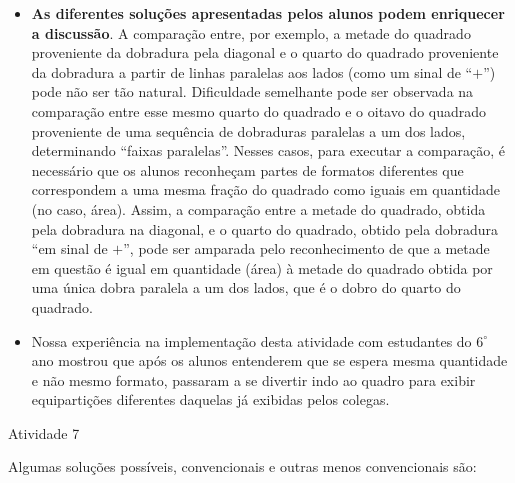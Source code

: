\begin{multicols}{2}
\begin{itemize}
    \item \textbf{As diferentes soluções apresentadas pelos alunos podem enriquecer a discussão}. A comparação entre, por exemplo, a metade do quadrado proveniente da dobradura pela diagonal e o quarto do quadrado proveniente da dobradura a partir de linhas paralelas aos lados (como um sinal de ``$+$'') pode não ser tão natural. Dificuldade semelhante pode ser observada na comparação entre esse mesmo quarto do quadrado e o oitavo do quadrado proveniente de uma sequência de dobraduras paralelas a um dos lados, determinando ``faixas paralelas''. Nesses casos, para executar a comparação, é necessário que os alunos reconheçam partes de formatos diferentes que correspondem a uma mesma fração do quadrado como iguais em quantidade (no caso, área). Assim, a comparação entre a metade do quadrado, obtida pela dobradura na diagonal, e o quarto do quadrado, obtido pela dobradura ``em sinal de $+$'', pode ser amparada pelo reconhecimento de que a metade em questão é igual em quantidade (área) à metade do quadrado obtida por uma única dobra paralela a um dos lados, que é o dobro do quarto do quadrado.

\begin{center}
  \quad\quad
\end{center}

\item Nossa experiência na implementação desta atividade com estudantes do $6^\circ$ ano mostrou que após os alunos entenderem que se espera mesma quantidade e não mesmo formato, passaram a se divertir indo ao quadro para exibir equipartições diferentes daquelas já exibidas pelos colegas.
\end{itemize} %

\begin{resposta*}{Atividade 7}

  Algumas soluções possíveis, convencionais e outras menos convencionais são:


\end{resposta*}
\end{multicols}
